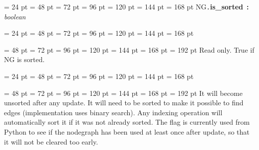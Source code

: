 {{{{\par}
\par}
\par}
{\par \noindent  \leftskip = 24 pt  \leftmargini = 48 pt  \leftmarginii = 72 pt  \leftmarginiii = 96 pt  \leftmarginiv = 120 pt  \leftmarginv = 144 pt  \leftmarginvi = 168 pt NG{\tt .\/}{\bf {\large {\bf is{\_}sorted\/}}\/}~{\bf :}  {\em boolean\/}\par}
{\par \noindent  \leftskip = 24 pt  \leftmargini = 48 pt  \leftmarginii = 72 pt  \leftmarginiii = 96 pt  \leftmarginiv = 120 pt  \leftmarginv = 144 pt  \leftmarginvi = 168 pt {\par \noindent
{\par \noindent  \leftskip = 48 pt  \leftmargini = 72 pt  \leftmarginii = 96 pt  \leftmarginiii = 120 pt  \leftmarginiv = 144 pt  \leftmarginv = 168 pt  \leftmarginvi = 192 pt  Read only. True if NG is sorted.
\par}
\par}
\par}
{\par \noindent  \leftskip = 24 pt  \leftmargini = 48 pt  \leftmarginii = 72 pt  \leftmarginiii = 96 pt  \leftmarginiv = 120 pt  \leftmarginv = 144 pt  \leftmarginvi = 168 pt {\par \noindent
{\par \noindent  \leftskip = 48 pt  \leftmargini = 72 pt  \leftmarginii = 96 pt  \leftmarginiii = 120 pt  \leftmarginiv = 144 pt  \leftmarginv = 168 pt  \leftmarginvi = 192 pt  It will become unsorted after any update. It will need to be
sorted to make it possible to find edges (implementation uses binary
search). Any indexing operation will automatically sort it if it was
not already sorted.  The flag is currently used from Python to see if
the nodegraph has been used at least once after update, so that it
will not be cleared too early.
\par}
\par}
\par}
\par}

